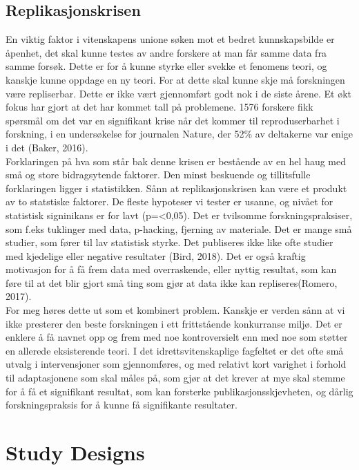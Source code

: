 \documentclass[
]{book}
\begin{document}
\hypertarget{replikasjonskrisen}{%
\section{Replikasjonskrisen}\label{replikasjonskrisen}}

En viktig faktor i vitenskapens unione søken mot et bedret kunnskapsbilde er åpenhet, det skal kunne testes av andre forskere at man får samme data fra samme forsøk. Dette er for å kunne styrke eller svekke et fenomens teori, og kanskje kunne oppdage en ny teori. For at dette skal kunne skje må forskningen være repliserbar. Dette er ikke vært gjennomført godt nok i de siste årene. Et økt fokus har gjort at det har kommet tall på problemene. 1576 forskere fikk spørsmål om det var en signifikant krise når det kommer til reproduserbarhet i forskning, i en undersøkelse for journalen Nature, der 52\% av deltakerne var enige i det (Baker, 2016).\\
Forklaringen på hva som står bak denne krisen er bestående av en hel haug med små og store bidragsytende faktorer. Den minst beskuende og tillitsfulle forklaringen ligger i statistikken. Sånn at replikasjonskrisen kan være et produkt av to statstiske faktorer. De fleste hypoteser vi tester er usanne, og nivået for statistisk signinikans er for lavt (p=\textless0,05). Det er tvilsomme forskningspraksiser, som f.eks tuklinger med data, p-hacking, fjerning av materiale. Det er mange små studier, som fører til lav statistisk styrke. Det publiseres ikke like ofte studier med kjedelige eller negative resultater (Bird, 2018). Det er også kraftig motivasjon for å få frem data med overraskende, eller nyttig resultat, som kan føre til at det blir gjort små ting som gjør at data ikke kan repliseres(Romero, 2017).\\
For meg høres dette ut som et kombinert problem. Kanskje er verden sånn at vi ikke presterer den beste forskningen i ett frittstående konkurranse miljø. Det er enklere å få navnet opp og frem med noe kontroversielt enn med noe som støtter en allerede eksisterende teori. I det idrettsvitenskaplige fagfeltet er det ofte små utvalg i intervensjoner som gjennomføres, og med relativt kort varighet i forhold til adaptasjonene som skal måles på, som gjør at det krever at mye skal stemme for å få et signifikant resultat, som kan forsterke publikasjonsskjevheten, og dårlig forskningspraksis for å kunne få signifikante resultater.

\hypertarget{study-designs}{%
\chapter{\texorpdfstring{\textbf{Study Designs}}{Study Designs}}\label{study-designs}}
\end{document}
